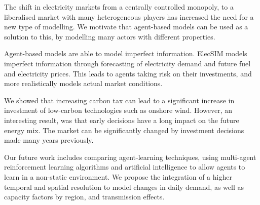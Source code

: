
The shift in electricity markets from a centrally controlled monopoly, to a liberalised market with many heterogeneous players has increased the need for a new type of modelling. We motivate that agent-based models can be used as a solution to this, by modelling many actors with different properties. 

Agent-based models are able to model imperfect information. ElecSIM models imperfect information through forecasting of electricity demand and future fuel and electricity prices. This leads to agents taking risk on their investments, and more realistically models actual market conditions.

We showed that increasing carbon tax can lead to a significant increase in investment of low-carbon technologies such as onshore wind. However, an interesting result, was that early decisions have a long impact on the future energy mix. The market can be significantly changed by investment decisions made many years previously. 

Our future work includes comparing agent-learning techniques, using multi-agent reinforcement learning algorithms and artificial intelligence to allow agents to learn in a non-static environment. We propose the integration of a higher temporal and spatial resolution to model changes in daily demand, as well as capacity factors by region, and transmission effects.



